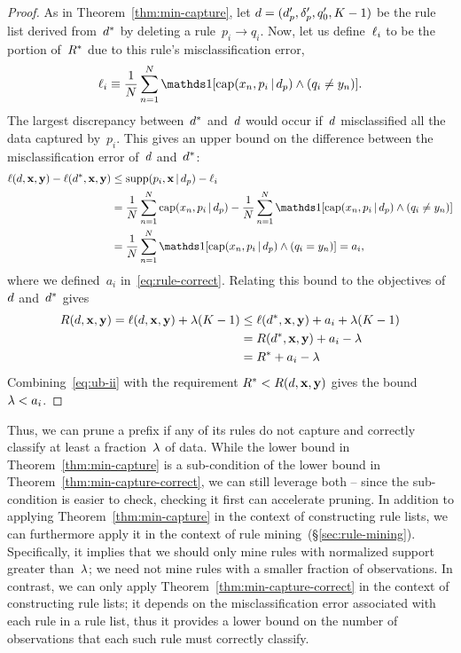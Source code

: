 \begin{proof}
As in Theorem~\ref{thm:min-capture},
let ${{d} =  (d_p', \delta_p', q_0', K-1)}$ be the rule list
derived from~$d^*$ by deleting a rule~${p_i \rightarrow q_i}$.
%
Now, let us define~$\ell_i$ to be the portion of~$R^*$
due to this rule's misclassification error,
\begin{align}
\Loss_i \equiv \frac{1}{N} \sum_{n=1}^N
  \one [ \Cap(x_n, p_i \given \Prefix) \wedge (q_i \neq y_n) ].
\end{align}
The largest discrepancy between~$d^*$ and~${d}$ would
occur if~${d}$ misclassified all the data captured by~$p_i$.
%
This gives an upper bound on the difference between
the misclassification error of~${d}$ and~$d^*$:
\begin{align}
\Loss(\RL, \x, \y) - \Loss(\OptimalRL, \x, \y)
&\le \Supp(p_i, \x \given \Prefix) - \Loss_i \nn \\
&= \frac{1}{N} \sum_{n=1}^N \Cap(x_n, p_i \given \Prefix)
  - \frac{1}{N} \sum_{n=1}^N
  \one [ \Cap(x_n, p_i \given \Prefix) \wedge (q_i \neq y_n) ] \nn \\
&= \frac{1}{N} \sum_{n=1}^N
  \one [ \Cap(x_n, p_i \given \Prefix) \wedge (q_i = y_n) ] = a_i,
\end{align}
where we defined~$a_i$ in~\eqref{eq:rule-correct}.
%
Relating this bound to the objectives of~${d}$ and~$d^*$ gives
\begin{align}
\Obj(\RL, \x, \y) = \Loss(\RL, \x, \y) + \Reg (K - 1)
&\le \Loss(\OptimalRL, \x, \y) + a_i + \Reg(K - 1) \nn \\
&= \Obj(\OptimalRL, \x, \y) + a_i - \Reg \nn \\
&= \OptimalObj + a_i - \Reg
\label{eq:ub-ii}
\end{align}
Combining~\eqref{eq:ub-ii} with the requirement
${R^* < R({d}, \mathbf{x}, \mathbf{y})}$ gives the bound~${{\lambda} < a_i}$.
\end{proof}

Thus, we can prune a prefix if any of its rules do not capture
and correctly classify at least a fraction~${\lambda}$ of data.
%
While the lower bound in Theorem~\ref{thm:min-capture} is a sub-condition
of the lower bound in Theorem~\ref{thm:min-capture-correct},
we can still leverage both -- since the sub-condition is easier to check,
checking it first can accelerate pruning.
%
In addition to applying Theorem~\ref{thm:min-capture} in the context of
constructing rule lists, we can furthermore apply it in the context of
rule mining~(\S\ref{sec:rule-mining}).
%
Specifically, it implies that we should only mine rules with
normalized support greater than~${\lambda}$;
we need not mine rules with a smaller fraction of observations.
%
In contrast, we can only apply Theorem~\ref{thm:min-capture-correct}
in the context of constructing rule lists;
it depends on the misclassification error associated with each
rule in a rule list, thus it provides a lower bound on the number of
observations that each such rule must correctly classify.

